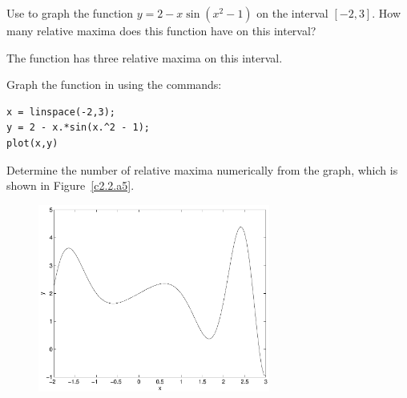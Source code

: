 \documentclass{ximera}
\begin{document}
\begin{computerExercise} \label{c2.2.a5}
Use \Matlab to graph the function $y = 2 - x\sin(x^2-1)$ on the interval
$[-2,3]$.  How many relative maxima does this function have on this interval?

\begin{solution}

\ans The function has three relative maxima on this interval.

\soln Graph the function in \Matlab using the commands:
\begin{verbatim}
x = linspace(-2,3);
y = 2 - x.*sin(x.^2 - 1);
plot(x,y)
\end{verbatim}
Determine the number of relative maxima numerically from the graph, which
is shown in Figure~\ref{c2.2.a5}.

\begin{figure}[htb]
                       \centerline{%
                       \includegraphics[width=3.0in]{exfigure/2-2-a5.pdf}}
\end{figure}








\end{solution}
\end{computerExercise}
\end{document}
